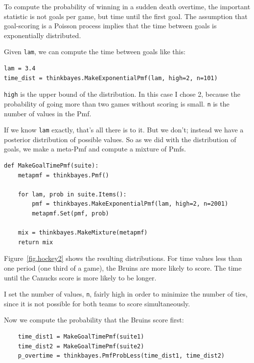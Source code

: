 \documentclass[12pt]{book}
\begin{document}
To compute the probability of winning in a sudden death overtime,
the important statistic is not goals per game, but time until the
first goal.  The assumption that goal-scoring is a Poisson process
implies that the time between goals
is exponentially distributed.

Given {\tt lam}, we can compute the time between goals like this: 

\begin{verbatim}
lam = 3.4
time_dist = thinkbayes.MakeExponentialPmf(lam, high=2, n=101)
\end{verbatim}  

{\tt high} is the upper bound of the distribution.  In this case
I chose 2, because the probability of going more than two games
without scoring is small.  {\tt n} is the number of values in
the Pmf.

If we know {\tt lam} exactly, that's all there is to it.
But we don't; instead we have a posterior
distribution of possible values.  So as we did with the distribution
of goals, we make a meta-Pmf and compute a mixture of
Pmfs.

\begin{verbatim}
def MakeGoalTimePmf(suite):
    metapmf = thinkbayes.Pmf()

    for lam, prob in suite.Items():
        pmf = thinkbayes.MakeExponentialPmf(lam, high=2, n=2001)
        metapmf.Set(pmf, prob)

    mix = thinkbayes.MakeMixture(metapmf)
    return mix
\end{verbatim}  

Figure~\ref{fig.hockey2} shows the resulting distributions.  For
time values less than one period (one third of a game), the Bruins
are more likely to score.  The time until the Canucks score is
more likely to be longer.

I set the number of values, {\tt n}, fairly high in order to minimize
the number of ties, since it is not possible for both teams
to score simultaneously.

Now we compute the probability that the Bruins score first:

\begin{verbatim}
    time_dist1 = MakeGoalTimePmf(suite1)
    time_dist2 = MakeGoalTimePmf(suite2)
    p_overtime = thinkbayes.PmfProbLess(time_dist1, time_dist2)
\end{verbatim}  
\end{document}
